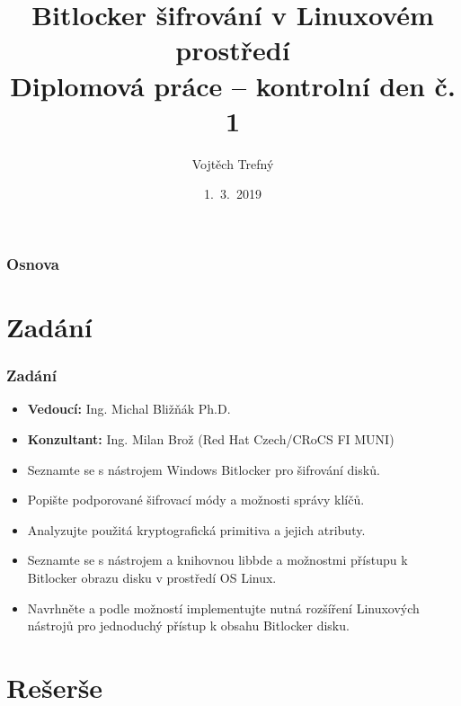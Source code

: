 \documentclass{beamer}
\title[Bitlocker šifrování v Linuxovém prostředí]{Bitlocker šifrování v Linuxovém prostředí\\\small{Diplomová práce -- kontrolní den č. 1}}
\author{Vojtěch Trefný}
\institute[FAI UTB]{Fakulta aplikované informatiky UTB}
\date{1.~3.~2019}
\begin{document}
\begin{frame}
	\titlepage
\end{frame}

\begin{frame}
	\frametitle{Osnova}
	\tableofcontents
\end{frame}


\section{Zadání}

\begin{frame}
	\frametitle{Zadání}
	\begin{block}{}
		\begin{itemize}
			\item \textbf{Vedoucí:} Ing. Michal Bližňák Ph.D.
			\item \textbf{Konzultant:} Ing. Milan Brož (Red Hat Czech/CRoCS FI MUNI)
		\end{itemize}
	\end{block}

	\begin{block}{}
		\begin{itemize}
			\item Seznamte se s nástrojem Windows Bitlocker pro šifrování disků.
			\item Popište podporované šifrovací módy a možnosti správy klíčů.
			\item Analyzujte použitá kryptografická primitiva a jejich atributy.
			\item Seznamte se s nástrojem a knihovnou libbde a možnostmi přístupu k Bitlocker obrazu disku v prostředí OS Linux.
			\item Navrhněte a podle možností implementujte nutná rozšíření Linuxových nástrojů pro jednoduchý přístup k obsahu Bitlocker disku.
		\end{itemize}
	\end{block}

\end{frame}


\section{Rešerše}
\end{document}
